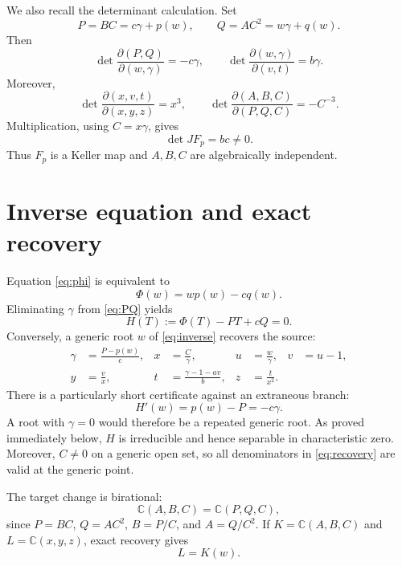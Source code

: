 \documentclass[11pt]{article}
\theoremstyle{remark}
\newcommand{\C}{\mathbb C}
\begin{document}
We also recall the determinant calculation.  Set
\begin{equation}
 P=BC=c\gamma+p(w),\qquad
 Q=AC^2=w\gamma+q(w).                              \label{eq:PQ}
\end{equation}
Then
\[
 \det\frac{\partial(P,Q)}{\partial(w,\gamma)}=-c\gamma,
 \qquad
 \det\frac{\partial(w,\gamma)}{\partial(v,t)}=b\gamma.
\]
Moreover,
\[
 \det\frac{\partial(x,v,t)}{\partial(x,y,z)}=x^3,
 \qquad
 \det\frac{\partial(A,B,C)}{\partial(P,Q,C)}=-C^{-3}.
\]
Multiplication, using $C=x\gamma$, gives
\begin{equation}
 \det JF_p=bc\ne0.                                  \label{eq:jac}
\end{equation}
Thus $F_p$ is a Keller map and $A,B,C$ are algebraically independent.

\section{Inverse equation and exact recovery}

Equation \eqref{eq:phi} is equivalent to
\[
 \Phi(w)=wp(w)-cq(w).
\]
Eliminating $\gamma$ from \eqref{eq:PQ} yields
\begin{equation}
 H(T):=\Phi(T)-PT+cQ=0.                             \label{eq:inverse}
\end{equation}
Conversely, a generic root $w$ of \eqref{eq:inverse} recovers the source:
\begin{equation}
\begin{aligned}
 \gamma&=\frac{P-p(w)}c,&
 x&=\frac C\gamma,&
 u&=\frac w\gamma,&
 v&=u-1,\\
 y&=\frac vx,&
 t&=\frac{\gamma-1-av}{b},&
 z&=\frac t{x^2}.&
\end{aligned}                                      \label{eq:recovery}
\end{equation}
There is a particularly short certificate against an extraneous branch:
\begin{equation}
 H'(w)=p(w)-P=-c\gamma.                             \label{eq:derivative}
\end{equation}
A root with $\gamma=0$ would therefore be a repeated generic root.
As proved immediately below, $H$ is irreducible and hence separable in
characteristic zero.  Moreover, $C\ne0$ on a generic open set, so all
denominators in \eqref{eq:recovery} are valid at the generic point.

The target change is birational:
\[
 \C(A,B,C)=\C(P,Q,C),
\]
since $P=BC$, $Q=AC^2$, $B=P/C$, and $A=Q/C^2$.  If
$K=\C(A,B,C)$ and $L=\C(x,y,z)$, exact recovery gives
\begin{equation}
 L=K(w).                                            \label{eq:rootfield}
\end{equation}
\end{document}
